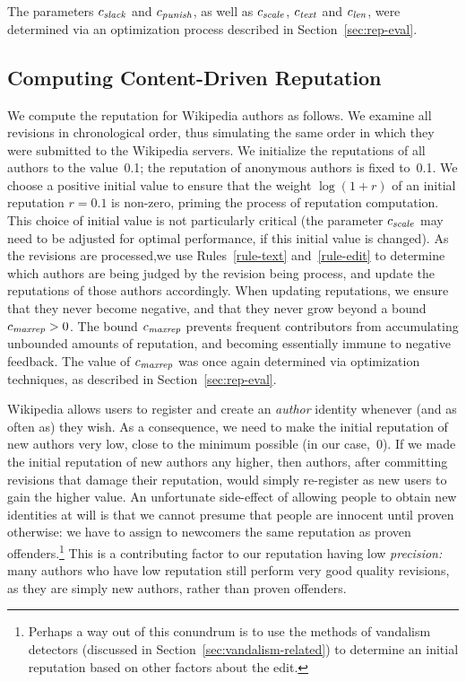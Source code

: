 The parameters ${c_{{\text{\textit{slack}}}}}$ and ${c_{{\text{\textit{punish}}}}}$, as well as ${c_{{\text{\textit{scale}}}}}$,
${c_{{\text{\textit{text}}}}}$ and ${c_{{\text{\textit{len}}}}}$, were determined via an optimization
process described in Section~\ref{sec:rep-eval}.

\subsection{Computing Content-Driven Reputation}

We compute the reputation for Wikipedia authors as follows. 
We examine all revisions in chronological order, thus simulating the
same order in which they were submitted to the Wikipedia servers. 
We initialize the reputations of all authors to the value~0.1;
the reputation of anonymous authors is fixed to~0.1.  
We choose a positive initial value to ensure that the weight
$\log (1+r)$ of an initial reputation $r = 0.1$ is non-zero, priming
the process of reputation computation.  
This choice of initial value is not particularly critical (the
parameter ${c_{{\text{\textit{scale}}}}}$ may need to be adjusted for optimal performance,
if this initial value is changed). 
As the revisions are processed,we use Rules~\ref{rule-text}
and~\ref{rule-edit} to determine which authors are being
judged by the revision being process,
and update the reputations of those authors accordingly.
When updating reputations, we ensure that they never become negative,
and that they never grow beyond a bound ${c_{{\text{\textit{maxrep}}}}} > 0$. 
The bound ${c_{{\text{\textit{maxrep}}}}}$ prevents frequent contributors from
accumulating unbounded amounts of reputation, and becoming essentially
immune to negative feedback. 
The value of ${c_{{\text{\textit{maxrep}}}}}$ was once again determined via
optimization techniques, as described in Section~\ref{sec:rep-eval}.

Wikipedia allows users to register and create an {\em author\/}
identity whenever (and as often as) they wish. 
As a consequence, we need to make the initial reputation of new authors
very low, close to the minimum possible (in our case,~0). 
If we made the initial reputation of new authors any higher,
then authors, after committing revisions that damage their reputation,
would simply re-register as new users to gain the higher value. 
An unfortunate side-effect of allowing people to obtain new identities
at will is that we cannot presume that people are innocent until
proven otherwise: we have to assign to newcomers the same reputation
as proven offenders.\footnote{Perhaps a way out of this conundrum
is to use the methods of vandalism detectors (discussed
in Section~\ref{sec:vandalism-related}) to determine an
initial reputation based on other factors about the edit.}
This is a contributing factor to our reputation having low 
{\em precision:\/} many authors who have low reputation still perform
very good quality revisions, as they are simply new authors, rather than
proven offenders. 


